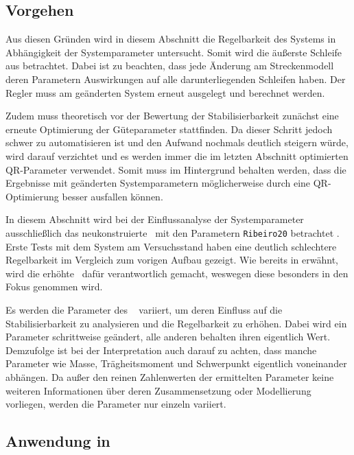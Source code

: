 \subsection{Vorgehen}

Aus diesen Gründen wird in diesem Abschnitt die Regelbarkeit des Systems in Abhängigkeit der Systemparameter untersucht.
Somit wird die äußerste Schleife aus  betrachtet.
Dabei ist zu beachten, dass jede Änderung am Streckenmodell \bzw deren Parametern Auswirkungen auf alle darunterliegenden Schleifen haben.
Der Regler muss am geänderten System erneut ausgelegt und berechnet werden.

Zudem muss theoretisch vor der Bewertung der Stabilisierbarkeit zunächst eine erneute Optimierung der Güteparameter stattfinden.
Da dieser Schritt jedoch schwer zu automatisieren ist und den Aufwand nochmals deutlich steigern würde, wird darauf verzichtet und es werden immer die im letzten Abschnitt optimierten QR-Parameter verwendet.
Somit muss im Hintergrund behalten werden, dass die Ergebnisse mit geänderten Systemparametern möglicherweise durch eine QR-Optimierung besser ausfallen können.

In diesem Abschnitt wird bei der Einflussanalyse der Systemparameter ausschließlich das neukonstruierte \dpd\ mit den Parametern \texttt{Ribeiro20} betrachtet .
Erste Tests mit dem System am Versuchsstand haben eine deutlich schlechtere Regelbarkeit im Vergleich zum vorigen Aufbau gezeigt.
Wie bereits in  erwähnt, wird die erhöhte \crb\ dafür verantwortlich gemacht, weswegen diese besonders in den Fokus genommen wird.

Es werden die Parameter des \spds\  variiert, um deren Einfluss auf die Stabilisierbarkeit zu analysieren und die Regelbarkeit zu erhöhen.
Dabei wird ein Parameter schrittweise geändert, alle anderen behalten ihren eigentlich Wert.
Demzufolge ist bei der Interpretation auch darauf zu achten, dass manche Parameter wie Masse, Trägheitsmoment und Schwerpunkt eigentlich voneinander abhängen.
Da außer den reinen Zahlenwerten der ermittelten Parameter keine weiteren Informationen über deren Zusammensetzung oder Modellierung vorliegen, werden die Parameter nur einzeln variiert.


\subsection{Anwendung in \ml}

